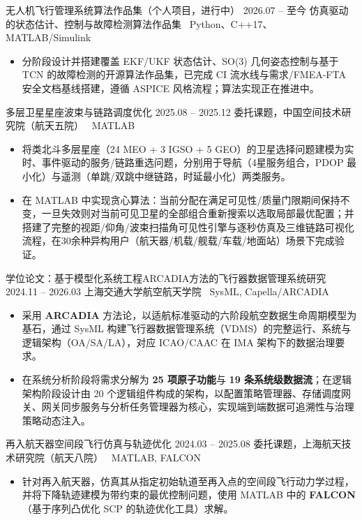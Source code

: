 \documentclass[zh]{resume}
\begin{document}

\resumeentry
  {无人机飞行管理系统算法作品集（个人项目，进行中）}
  {2026.07 -- 至今}
  {仿真驱动的状态估计、控制与故障检测算法作品集 \textbar\ Python、C++17、MATLAB/Simulink}
  {}
\begin{itemize}
  \item 分阶段设计并搭建覆盖 EKF/UKF 状态估计、SO(3) 几何姿态控制与基于 TCN 的故障检测的开源算法作品集，已完成 CI 流水线与需求/FMEA-FTA 安全文档基线搭建，遵循 ASPICE 风格流程；算法实现正在推进中。
\end{itemize}

\resumeentry
  {多层卫星星座波束与链路调度优化}
  {2025.08 -- 2025.12}
  {委托课题，中国空间技术研究院（航天五院） \textbar\ MATLAB}
  {}
\begin{itemize}
  \item 将类北斗多层星座（24 MEO + 3 IGSO + 5 GEO）的卫星选择问题建模为实时、事件驱动的服务/链路重选问题，分别用于导航（4星服务组合，PDOP 最小化）与遥测（单跳/双跳中继链路，时延最小化）两类服务。
  \item 在 MATLAB 中实现贪心算法：当前分配在满足可见性/质量门限期间保持不变，一旦失效则对当前可见卫星的全部组合重新搜索以选取局部最优配置；并搭建了完整的视距/仰角/波束扫描角可见性引擎与逐秒仿真及三维链路可视化流程，在30余种异构用户（航天器/机载/舰载/车载/地面站）场景下完成验证。
\end{itemize}

\resumeentry
  {学位论文：基于模型化系统工程ARCADIA方法的飞行器数据管理系统研究}
  {2024.11 -- 2026.03}
  {上海交通大学航空航天学院 \textbar\ SysML, Capella/ARCADIA}
  {}
\begin{itemize}
  \item 采用 \textbf{ARCADIA} 方法论，以适航标准驱动的六阶段航空数据生命周期模型为基石，通过 SysML 构建飞行器数据管理系统（VDMS）的完整运行、系统与逻辑架构（OA/SA/LA），对应 ICAO/CAAC 在 IMA 架构下的数据治理要求。
  \item 在系统分析阶段将需求分解为 \textbf{25 项原子功能}与 \textbf{19 条系统级数据流}；在逻辑架构阶段设计由 20 个逻辑组件构成的架构，以配置策略管理器、存储调度网关、网关同步服务与分析任务管理器为核心，实现端到端数据可追溯性与治理策略动态注入。
\end{itemize}

\resumeentry
  {再入航天器空间段飞行仿真与轨迹优化}
  {2024.03 -- 2025.08}
  {委托课题，上海航天技术研究院（航天八院） \textbar\ MATLAB, FALCON}
  {}
\begin{itemize}
  \item 针对再入航天器，仿真其从指定初始轨道至再入点的空间段飞行动力学过程，并将下降轨迹建模为带约束的最优控制问题，使用 MATLAB 中的 \textbf{FALCON}（基于序列凸优化 SCP 的轨迹优化工具）求解。
\end{itemize}
\end{document}
